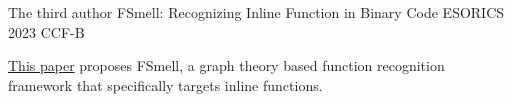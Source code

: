 

\begin{cventries}

  \cventry
    {The third author} %
    {FSmell: Recognizing Inline Function in Binary Code} %
    {ESORICS 2023} %
    {CCF-B} %
    {
      \begin{cvitems} %
        \item {\href{https://www.esorics2023.org/program/accepted_papers/}{\textcolor{awesome-skyblue}{This paper}} proposes FSmell, a graph theory based function recognition framework that specifically targets inline functions.}
      \end{cvitems}
    }

\end{cventries}
